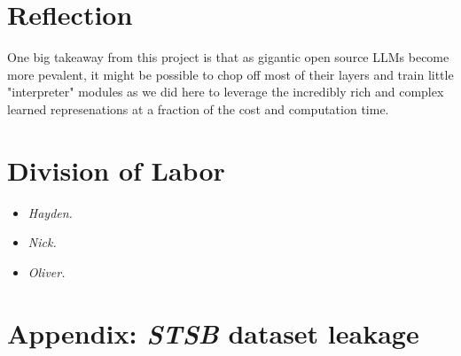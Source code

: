\documentclass[14pt]{article}
\begin{document}
\section{Reflection}

One big takeaway from this project is that as gigantic open source LLMs become more pevalent, it might be possible to chop off most of their layers and train little "interpreter" modules as we did here to leverage the incredibly rich and complex learned represenations at a fraction of the cost and computation time.

\section{Division of Labor}
\begin{itemize}
    \item \textit{Hayden.}
    \item \textit{Nick.} 
    \item \textit{Oliver.} 
\end{itemize}

\newpage
\section{Appendix: \textit{STSB} dataset leakage}
\end{document}
